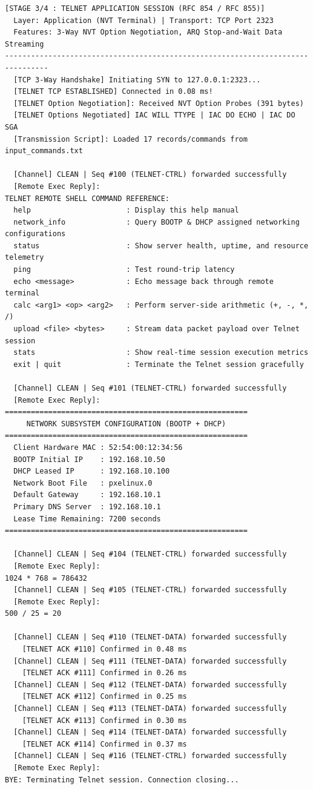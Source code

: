 \documentclass[12pt, a4paper]{article}
\begin{document}
\begin{lstlisting}[style=termstyle, caption=Authentic Terminal Output: TELNET Session Execution Trace]
[STAGE 3/4 : TELNET APPLICATION SESSION (RFC 854 / RFC 855)]
  Layer: Application (NVT Terminal) | Transport: TCP Port 2323
  Features: 3-Way NVT Option Negotiation, ARQ Stop-and-Wait Data Streaming
--------------------------------------------------------------------------------
  [TCP 3-Way Handshake] Initiating SYN to 127.0.0.1:2323...
  [TELNET TCP ESTABLISHED] Connected in 0.08 ms!
  [TELNET Option Negotiation]: Received NVT Option Probes (391 bytes)
  [TELNET Options Negotiated] IAC WILL TTYPE | IAC DO ECHO | IAC DO SGA
  [Transmission Script]: Loaded 17 records/commands from input_commands.txt

  [Channel] CLEAN | Seq #100 (TELNET-CTRL) forwarded successfully
  [Remote Exec Reply]:
TELNET REMOTE SHELL COMMAND REFERENCE:
  help                      : Display this help manual
  network_info              : Query BOOTP & DHCP assigned networking configurations
  status                    : Show server health, uptime, and resource telemetry
  ping                      : Test round-trip latency
  echo <message>            : Echo message back through remote terminal
  calc <arg1> <op> <arg2>   : Perform server-side arithmetic (+, -, *, /)
  upload <file> <bytes>     : Stream data packet payload over Telnet session
  stats                     : Show real-time session execution metrics
  exit | quit               : Terminate the Telnet session gracefully

  [Channel] CLEAN | Seq #101 (TELNET-CTRL) forwarded successfully
  [Remote Exec Reply]:
========================================================
     NETWORK SUBSYSTEM CONFIGURATION (BOOTP + DHCP)     
========================================================
  Client Hardware MAC : 52:54:00:12:34:56
  BOOTP Initial IP    : 192.168.10.50
  DHCP Leased IP      : 192.168.10.100
  Network Boot File   : pxelinux.0
  Default Gateway     : 192.168.10.1
  Primary DNS Server  : 192.168.10.1
  Lease Time Remaining: 7200 seconds
========================================================

  [Channel] CLEAN | Seq #104 (TELNET-CTRL) forwarded successfully
  [Remote Exec Reply]:
1024 * 768 = 786432
  [Channel] CLEAN | Seq #105 (TELNET-CTRL) forwarded successfully
  [Remote Exec Reply]:
500 / 25 = 20

  [Channel] CLEAN | Seq #110 (TELNET-DATA) forwarded successfully
    [TELNET ACK #110] Confirmed in 0.48 ms
  [Channel] CLEAN | Seq #111 (TELNET-DATA) forwarded successfully
    [TELNET ACK #111] Confirmed in 0.26 ms
  [Channel] CLEAN | Seq #112 (TELNET-DATA) forwarded successfully
    [TELNET ACK #112] Confirmed in 0.25 ms
  [Channel] CLEAN | Seq #113 (TELNET-DATA) forwarded successfully
    [TELNET ACK #113] Confirmed in 0.30 ms
  [Channel] CLEAN | Seq #114 (TELNET-DATA) forwarded successfully
    [TELNET ACK #114] Confirmed in 0.37 ms
  [Channel] CLEAN | Seq #116 (TELNET-CTRL) forwarded successfully
  [Remote Exec Reply]:
BYE: Terminating Telnet session. Connection closing...
\end{lstlisting}
\end{document}
